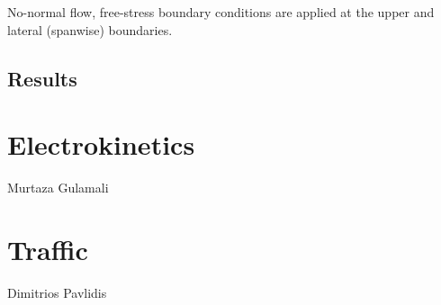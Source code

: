 No-normal flow, free-stress boundary conditions are applied at the upper and lateral
(spanwise) boundaries.


\subsection{Results}





\section{Electrokinetics}
\label{sect:electrokinetics}

Murtaza Gulamali


\section{Traffic}
\label{sect:traffic_eg}

Dimitrios Pavlidis









